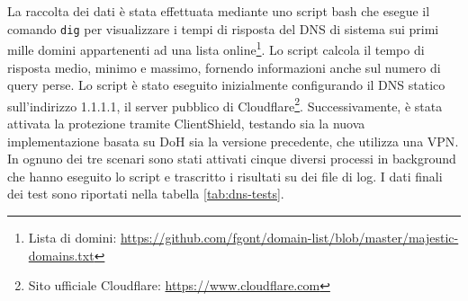 \documentclass[12pt,a4paper,openright,twoside]{book}
\begin{document}
La raccolta dei dati è stata effettuata mediante uno script bash che esegue il comando \texttt{dig} per visualizzare i tempi di risposta del \gls{DNS} di sistema sui primi mille domini appartenenti ad una lista online\footnote{Lista di domini: \url{https://github.com/fgont/domain-list/blob/master/majestic-domains.txt}}.
Lo script calcola il tempo di risposta medio, minimo e massimo, fornendo informazioni anche sul numero di query perse.
Lo script è stato eseguito inizialmente configurando il DNS statico sull’indirizzo 1.1.1.1, il server pubblico di Cloudflare\footnote{Sito ufficiale Cloudflare: \url{https://www.cloudflare.com}}. Successivamente, è stata attivata la protezione tramite ClientShield, testando sia la nuova implementazione basata su \gls{DoH} sia la versione precedente, che utilizza una \gls{VPN}.
In ognuno dei tre scenari sono stati attivati cinque diversi processi in background che hanno eseguito lo script e trascritto i risultati su dei file di log.
I dati finali dei test sono riportati nella tabella \ref{tab:dns-tests}.
\end{document}
